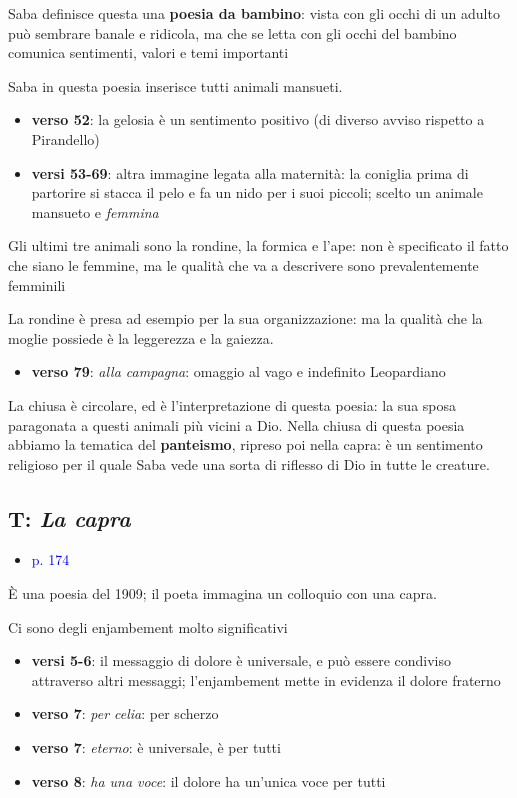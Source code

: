 \documentclass[a4paper, twoside, titlepage]{book}
\newcommand{\elenco}[1]{%
\begin{itemize}
#1
\end{itemize}}
\renewcommand{\emph}[1]{\textcolor{blue}{#1}}
\begin{document}
Saba definisce questa una \textbf{poesia da bambino}: vista con gli occhi di un adulto può sembrare banale e ridicola, ma che se letta con gli occhi del bambino comunica sentimenti, valori e temi importanti

Saba in questa poesia inserisce tutti animali mansueti.

\elenco{
	\item \textbf{verso 52}: la gelosia è un sentimento positivo (di diverso avviso rispetto a Pirandello)
	\item \textbf{versi 53-69}: altra immagine legata alla maternità: la coniglia prima di partorire si stacca il pelo e fa un nido per i suoi piccoli; scelto un animale mansueto e \textit{femmina}}

Gli ultimi tre animali sono la rondine, la formica e l'ape: non è specificato il fatto che siano le femmine, ma le qualità che va a descrivere sono prevalentemente femminili

La rondine è presa ad esempio per la sua organizzazione: ma la qualità che la moglie possiede è la leggerezza e la gaiezza.

\elenco{
	\item \textbf{verso 79}: \textit{alla campagna}: omaggio al vago e indefinito Leopardiano}

La chiusa è circolare, ed è l'interpretazione di questa poesia: la sua sposa paragonata a questi animali più vicini a Dio.
Nella chiusa di questa poesia abbiamo la tematica del \textbf{panteismo}, ripreso poi nella capra: è un sentimento religioso per il quale Saba vede una sorta di riflesso di Dio in tutte le creature.

\subsection{T: \textit{La capra}}

\elenco{\item \emph{p. 174}}

È una poesia del 1909; il poeta immagina un colloquio con una capra.

Ci sono degli enjambement molto significativi

\elenco{
	\item \textbf{versi 5-6}: il messaggio di dolore è universale, e può essere condiviso attraverso altri messaggi; l'enjambement mette in evidenza il dolore fraterno
	\item \textbf{verso 7}: \textit{per celia}: per scherzo
	\item \textbf{verso 7}: \textit{eterno}: è universale, è per tutti
	\item \textbf{verso 8}: \textit{ha una voce}: il dolore ha un'unica voce per tutti}
\end{document}
